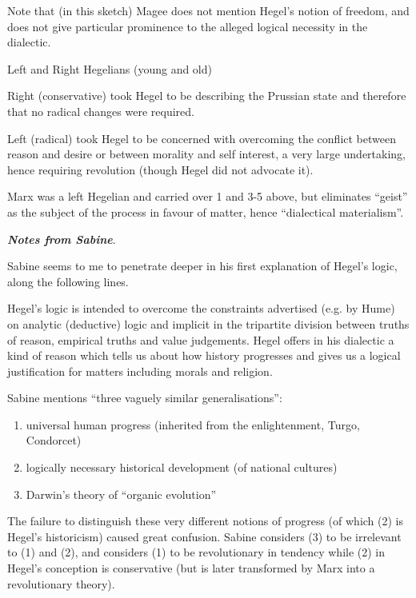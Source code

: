 \documentclass[10pt,titlepage]{book}
\begin{document}
Note that (in this sketch) Magee does not mention Hegel's notion of freedom, and does not give particular prominence to the alleged logical necessity in the dialectic. 

Left and Right Hegelians (young and old)

Right (conservative) took Hegel to be describing the Prussian state and therefore that no radical changes were required.

Left (radical) took Hegel to be concerned with overcoming the conflict between reason and desire or between morality and self interest, a very large undertaking, hence requiring revolution (though Hegel did not advocate it).

Marx was a left Hegelian and carried over 1 and 3-5 above, but eliminates ``geist'' as the subject of the process in favour of matter, hence ``dialectical materialism''.

{\bf\emph{Notes from Sabine}}.\label{Sab-Heg}

Sabine \cite{sabine63} seems to me to penetrate deeper in his first explanation of Hegel's logic, along the following lines.

Hegel's logic is intended to overcome the constraints advertised (e.g. by Hume) on analytic (deductive) logic and implicit in the tripartite division between truths of reason, empirical truths and value judgements.
Hegel offers in his dialectic a kind of reason which tells us about how history progresses and gives us a logical justification for matters including morals and religion.

Sabine mentions ``three vaguely similar generalisations'':

\begin{enumerate}
\item universal human progress (inherited from the enlightenment, Turgo, Condorcet)
  
\item logically necessary historical development (of national cultures)
  
\item Darwin's theory of ``organic evolution''
\end{enumerate}

The failure to distinguish these very different notions of progress (of which (2) is Hegel's historicism) caused great confusion.
Sabine considers (3) to be irrelevant to (1) and (2), and considers (1) to be revolutionary in tendency while (2) in Hegel's conception is conservative (but is later transformed by Marx into a revolutionary theory).
\end{document}
